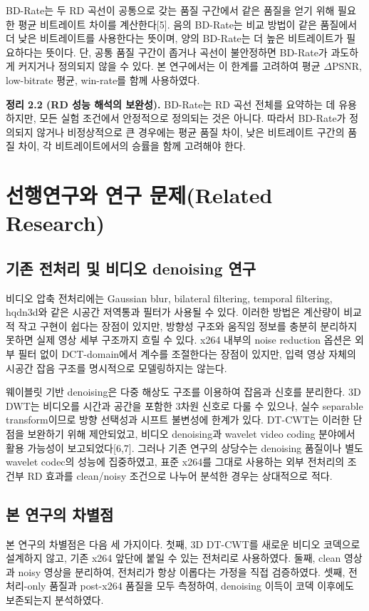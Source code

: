 \documentclass[10pt]{article}
\begin{document}
BD-Rate는 두 RD 곡선이 공통으로 갖는 품질 구간에서 같은 품질을 얻기 위해 필요한 평균 비트레이트 차이를 계산한다[5]. 음의 BD-Rate는 비교 방법이 같은 품질에서 더 낮은 비트레이트를 사용한다는 뜻이며, 양의 BD-Rate는 더 높은 비트레이트가 필요하다는 뜻이다. 단, 공통 품질 구간이 좁거나 곡선이 불안정하면 BD-Rate가 과도하게 커지거나 정의되지 않을 수 있다. 본 연구에서는 이 한계를 고려하여 평균 $\Delta$PSNR, low-bitrate 평균, win-rate를 함께 사용하였다.

\noindent\textbf{정리 2.2 (RD 성능 해석의 보완성).}
BD-Rate는 RD 곡선 전체를 요약하는 데 유용하지만, 모든 실험 조건에서 안정적으로 정의되는 것은 아니다. 따라서 BD-Rate가 정의되지 않거나 비정상적으로 큰 경우에는 평균 품질 차이, 낮은 비트레이트 구간의 품질 차이, 각 비트레이트에서의 승률을 함께 고려해야 한다.

\section{\large \bf 선행연구와 연구 문제(Related Research)}
\subsection{기존 전처리 및 비디오 denoising 연구}
비디오 압축 전처리에는 Gaussian blur, bilateral filtering, temporal filtering, hqdn3d와 같은 시공간 저역통과 필터가 사용될 수 있다. 이러한 방법은 계산량이 비교적 작고 구현이 쉽다는 장점이 있지만, 방향성 구조와 움직임 정보를 충분히 분리하지 못하면 실제 영상 세부 구조까지 흐릴 수 있다. x264 내부의 noise reduction 옵션은 외부 필터 없이 DCT-domain에서 계수를 조절한다는 장점이 있지만, 입력 영상 자체의 시공간 잡음 구조를 명시적으로 모델링하지는 않는다.

웨이블릿 기반 denoising은 다중 해상도 구조를 이용하여 잡음과 신호를 분리한다. 3D DWT는 비디오를 시간과 공간을 포함한 3차원 신호로 다룰 수 있으나, 실수 separable transform이므로 방향 선택성과 시프트 불변성에 한계가 있다. DT-CWT는 이러한 단점을 보완하기 위해 제안되었고, 비디오 denoising과 wavelet video coding 분야에서 활용 가능성이 보고되었다[6,7]. 그러나 기존 연구의 상당수는 denoising 품질이나 별도 wavelet codec의 성능에 집중하였고, 표준 x264를 그대로 사용하는 외부 전처리의 조건부 RD 효과를 clean/noisy 조건으로 나누어 분석한 경우는 상대적으로 적다.

\subsection{본 연구의 차별점}
본 연구의 차별점은 다음 세 가지이다. 첫째, 3D DT-CWT를 새로운 비디오 코덱으로 설계하지 않고, 기존 x264 앞단에 붙일 수 있는 전처리로 사용하였다. 둘째, clean 영상과 noisy 영상을 분리하여, 전처리가 항상 이롭다는 가정을 직접 검증하였다. 셋째, 전처리-only 품질과 post-x264 품질을 모두 측정하여, denoising 이득이 코덱 이후에도 보존되는지 분석하였다.
\end{document}
